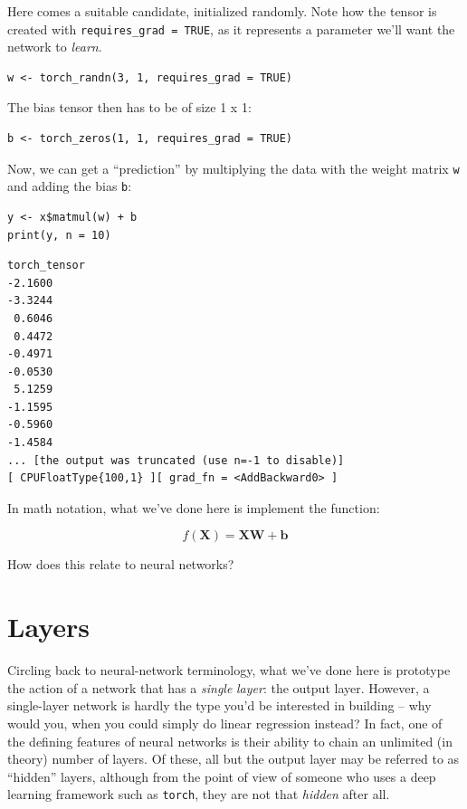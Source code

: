 \documentclass[
  letterpaper,
]{krantz}
\begin{document}
Here comes a suitable candidate, initialized randomly. Note how the
tensor is created with \texttt{requires\_grad\ =\ TRUE}, as it
represents a parameter we'll want the network to \emph{learn}.

\begin{verbatim}
w <- torch_randn(3, 1, requires_grad = TRUE)
\end{verbatim}

The bias tensor then has to be of size 1 x 1:

\begin{verbatim}
b <- torch_zeros(1, 1, requires_grad = TRUE)
\end{verbatim}

Now, we can get a ``prediction'' by multiplying the data with the
weight matrix \texttt{w} and adding the bias
\texttt{b}:

\begin{verbatim}
y <- x$matmul(w) + b
print(y, n = 10)
\end{verbatim}

\begin{verbatim}
torch_tensor
-2.1600
-3.3244
 0.6046
 0.4472
-0.4971
-0.0530
 5.1259
-1.1595
-0.5960
-1.4584
... [the output was truncated (use n=-1 to disable)]
[ CPUFloatType{100,1} ][ grad_fn = <AddBackward0> ]
\end{verbatim}

In math notation, what we've done here is implement the function:

\[
f(\mathbf{X}) = \mathbf{X}\mathbf{W} + \mathbf{b}
\]

How does this relate to neural networks?

\hypertarget{layers}{%
\section{Layers}\label{layers}}

Circling back to neural-network terminology, what we've done here is
prototype the action of a network that has a \emph{single}
\emph{layer}: the output layer. However, a single-layer
network is hardly the type you'd be interested in building -- why would
you, when you could simply do linear regression instead? In fact, one of
the defining features of neural networks is their ability to chain an
unlimited (in theory) number of layers. Of these, all but the
output layer may be referred to as ``hidden''
layers, although from the point of view of someone who uses a deep
learning framework such as \texttt{torch}, they are not that
\emph{hidden} after all.
\end{document}
